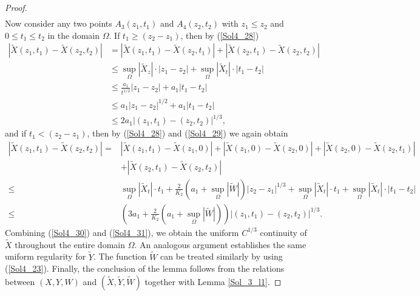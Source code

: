 \documentclass[3p,11pt]{elsarticle}
\numberwithin{equation}{section}
\begin{document}
\begin{proof}
\begin{equation}
\begin{split}
        \end{split}
    \end{equation}
    Now consider any two points $A_{3}(z_{1},t_{1})$ and $A_{4}(z_{2},t_{2})$ with $z_{1}\le z_{2}$ and $0\le t_{1}\le t_{2}$ in the domain $\Omega$. If $t_{1}\ge (z_{2}-z_{1})$, then by (\ref{Sol4_28})
   \begin{equation}\label{Sol4_30}
        \begin{split}
            |\widetilde X(z_1,t_1)-\widetilde X(z_2,t_2)|&=|\widetilde X(z_1,t_1)-\widetilde X(z_2,t_1)|+|\widetilde X(z_2,t_1)-\widetilde X(z_2,t_2)| \\
            &\leq \sup_{\Omega}|\widetilde X_z|\cdot |z_1-z_2|+\sup_{\Omega}|\widetilde X_t|\cdot|t_1-t_2|\\
            & \leq\frac{a_1}{t^{1/2}}|z_1-z_2|+a_1|t_1-t_2|\\
            &\leq a_1|z_1-z_2|^{1/2}+a_1|t_1-t_2|\\
            &\leq 2a_1|(z_1,t_1)-(z_2,t_2)|^{1/3},
        \end{split}
    \end{equation}
    and if $t_{1}<(z_{2}-z_{1})$, then by (\ref{Sol4_28}) and (\ref{Sol4_29}) we again obtain
     \begin{equation}\label{Sol4_31}
        \begin{split}
            |\widetilde X(z_1,t_1)-\widetilde X(z_2,t_2)|=&|\widetilde X(z_1,t_1)-\widetilde X(z_1,0)|+|\widetilde X(z_1,0)-\widetilde X(z_2,0)|+|\widetilde X(z_2,0)-\widetilde X(z_2,t_1)|\\ &+|\widetilde X(z_2,t_1)-\widetilde X(z_2,t_2)|\\
           \leq  &\sup_{\Omega}|\widetilde X_t|\cdot t_1+ \frac{2}{K_2}(a_1+\sup_{\Omega}|\widetilde W|)|z_2-z_1|^{1/3}+               \sup_{\Omega}|\widetilde X_t|\cdot t_1+\sup_{\Omega}|\widetilde X_t|\cdot |t_1-t_2|\\
            \leq  &\left( 3a_1+ \frac{2}{K_2}(a_1+\sup_{\Omega}|\widetilde W|)\right)|(z_1,t_1)-(z_2,t_2)|^{1/3}.
        \end{split}
    \end{equation}
    Combining (\ref{Sol4_30}) and (\ref{Sol4_31}), we obtain the uniform $C^{1/3}$ continuity of $\widetilde X$ throughout the entire domain $\Omega$. An analogous argument establishes the same uniform regularity for $\widetilde Y$. The function $\widetilde W$ can be treated similarly by using (\ref{Sol4_23}). Finally, the conclusion of the lemma follows from the relations between $( X, Y,W)$ and $(\widetilde X,\widetilde Y,\widetilde W)$ together with Lemma \ref{Sol_3_l1}.
\end{proof}
\end{document}
